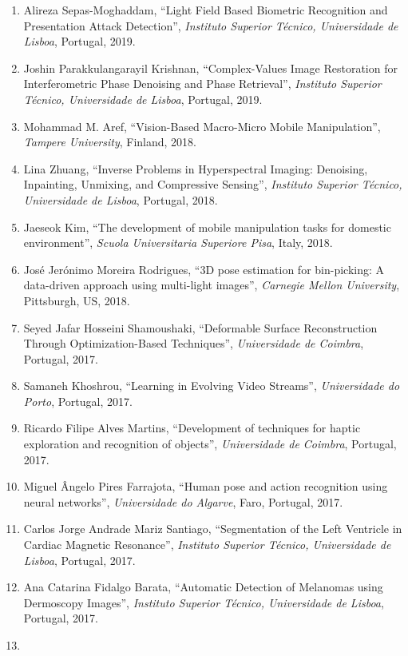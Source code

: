 \begin{enumerate}
  2019.
\item
  Alireza Sepas-Moghaddam, ``Light Field Based Biometric Recognition and
  Presentation Attack Detection'', \emph{Instituto Superior Técnico,
  Universidade de Lisboa}, Portugal, 2019.
\item
  Joshin Parakkulangarayil Krishnan, ``Complex-Values Image Restoration
  for Interferometric Phase Denoising and Phase Retrieval'',
  \emph{Instituto Superior Técnico, Universidade de Lisboa}, Portugal,
  2019.
\item
  Mohammad M. Aref, ``Vision-Based Macro-Micro Mobile Manipulation'',
  \emph{Tampere University}, Finland, 2018.
\item
  Lina Zhuang, ``Inverse Problems in Hyperspectral Imaging: Denoising,
  Inpainting, Unmixing, and Compressive Sensing'', \emph{Instituto
  Superior Técnico, Universidade de Lisboa}, Portugal, 2018.
\item
  Jaeseok Kim, ``The development of mobile manipulation tasks for
  domestic environment'', \emph{Scuola Universitaria Superiore Pisa},
  Italy, 2018.
\item
  José Jerónimo Moreira Rodrigues, ``3D pose estimation for bin-picking:
  A data-driven approach using multi-light images'', \emph{Carnegie
  Mellon University}, Pittsburgh, US, 2018.
\item
  Seyed Jafar Hosseini Shamoushaki, ``Deformable Surface Reconstruction
  Through Optimization-Based Techniques'', \emph{Universidade de
  Coimbra}, Portugal, 2017.
\item
  Samaneh Khoshrou, ``Learning in Evolving Video Streams'',
  \emph{Universidade do Porto}, Portugal, 2017.
\item
  Ricardo Filipe Alves Martins, ``Development of techniques for haptic
  exploration and recognition of objects'', \emph{Universidade de
  Coimbra}, Portugal, 2017.
\item
  Miguel Ângelo Pires Farrajota, ``Human pose and action recognition
  using neural networks'', \emph{Universidade do Algarve}, Faro,
  Portugal, 2017.
\item
  Carlos Jorge Andrade Mariz Santiago, ``Segmentation of the Left
  Ventricle in Cardiac Magnetic Resonance'', \emph{Instituto Superior
  Técnico, Universidade de Lisboa}, Portugal, 2017.
\item
  Ana Catarina Fidalgo Barata, ``Automatic Detection of Melanomas using
  Dermoscopy Images'', \emph{Instituto Superior Técnico, Universidade de
  Lisboa}, Portugal, 2017.
\item

\end{enumerate}
